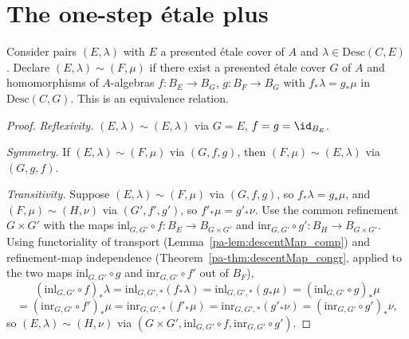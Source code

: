 \section{The one-step \'etale plus}

\begin{definition}
  \label{pa-def:picEtAffSetoid}
  \leanok

  Consider pairs \((E,\lambda)\) with \(E\) a presented \'etale cover of \(A\) and
  \(\lambda \in \mathrm{Desc}(C,E)\). Declare \((E,\lambda) \sim (F,\mu)\) if there exist a
  presented \'etale cover \(G\) of \(A\) and homomorphisms of \(A\)-algebras
  \(f \colon B_E \to B_G\), \(g \colon B_F \to B_G\) with \(f_{*}\lambda = g_{*}\mu\) in
  \(\mathrm{Desc}(C,G)\). This is an equivalence relation.
\end{definition}
\begin{proof}
  \leanok
  \emph{Reflexivity.} \((E,\lambda) \sim (E,\lambda)\) via \(G = E\), \(f = g = \id_{B_E}\).

  \emph{Symmetry.} If \((E,\lambda) \sim (F,\mu)\) via \((G,f,g)\), then \((F,\mu) \sim
  (E,\lambda)\) via \((G,g,f)\).

  \emph{Transitivity.} Suppose \((E,\lambda) \sim (F,\mu)\) via \((G,f,g)\), so \(f_{*}\lambda =
  g_{*}\mu\), and \((F,\mu) \sim (H,\nu)\) via \((G',f',g')\), so \(f'_{*}\mu = g'_{*}\nu\). Use
  the common refinement \(G \times G'\) with the maps \(\mathrm{inl}_{G,G'} \circ f \colon B_E
  \to B_{G \times G'}\) and \(\mathrm{inr}_{G,G'} \circ g' \colon B_H \to B_{G \times G'}\).
  Using functoriality of transport (Lemma~\ref{pa-lem:descentMap_comp}) and refinement-map
  independence (Theorem~\ref{pa-thm:descentMap_congr}, applied to the two maps
  \(\mathrm{inl}_{G,G'} \circ g\) and \(\mathrm{inr}_{G,G'} \circ f'\) out of \(B_F\)),
  \[
    (\mathrm{inl}_{G,G'} \circ f)_{*}\lambda = \mathrm{inl}_{G,G',*}(f_{*}\lambda) =
    \mathrm{inl}_{G,G',*}(g_{*}\mu) = (\mathrm{inl}_{G,G'} \circ g)_{*}\mu
  \]
  \[
    = (\mathrm{inr}_{G,G'} \circ f')_{*}\mu = \mathrm{inr}_{G,G',*}(f'_{*}\mu) =
    \mathrm{inr}_{G,G',*}(g'_{*}\nu) = (\mathrm{inr}_{G,G'} \circ g')_{*}\nu,
  \]
  so \((E,\lambda) \sim (H,\nu)\) via \((G \times G', \mathrm{inl}_{G,G'} \circ f,
  \mathrm{inr}_{G,G'} \circ g')\).
\end{proof}

